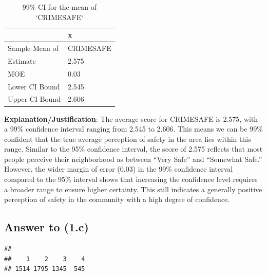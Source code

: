 \documentclass[
  11pt,
]{article}
\newenvironment{Shaded}{\begin{snugshade}}{\end{snugshade}}
\newcommand{\CommentTok}[1]{\textcolor[rgb]{0.56,0.35,0.01}{\textit{#1}}}
\newcommand{\FunctionTok}[1]{\textcolor[rgb]{0.13,0.29,0.53}{\textbf{#1}}}
\newcommand{\NormalTok}[1]{#1}
\newcommand{\SpecialCharTok}[1]{\textcolor[rgb]{0.81,0.36,0.00}{\textbf{#1}}}
\begin{document}
\begin{table}

\caption{\label{tab:q1-b}99\% CI for the mean of `CRIMESAFE`}
\centering
\begin{tabular}[t]{l|l}
\hline
  & x\\
\hline
Sample Mean of & CRIMESAFE\\
\hline
Estimate & 2.575\\
\hline
MOE & 0.03\\
\hline
Lower CI Bound & 2.545\\
\hline
Upper CI Bound & 2.606\\
\hline
\end{tabular}
\end{table}

\textbf{Explanation/Justification}: The average score for CRIMESAFE is
2.575, with a 99\% confidence interval ranging from 2.545 to 2.606. This
means we can be 99\% confident that the true average perception of
safety in the area lies within this range. Similar to the 95\%
confidence interval, the score of 2.575 reflects that most people
perceive their neighborhood as between ``Very Safe'' and ``Somewhat
Safe.'' However, the wider margin of error (0.03) in the 99\% confidence
interval compared to the 95\% interval shows that increasing the
confidence level requires a broader range to ensure higher certainty.
This still indicates a generally positive perception of safety in the
community with a high degree of confidence.

\subsection{Answer to (1.c)}\label{answer-to-1.c}

\begin{Shaded}
\end{Shaded}

\begin{verbatim}
##
##    1    2    3    4
## 1514 1795 1345  545
\end{verbatim}
\end{document}
